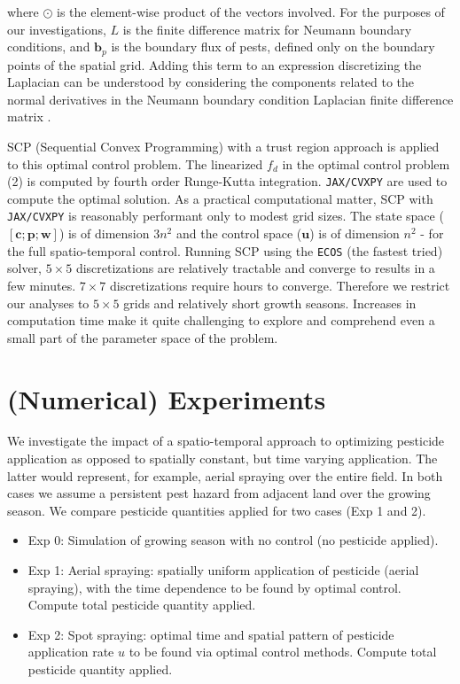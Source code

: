 \documentclass[11pt]{article}
\begin{document}
where $\odot$ is the element-wise product of the vectors involved. For the purposes of our investigations, $L$ is the finite difference matrix for Neumann boundary conditions, and $\bm{b}_p$ is the boundary flux of pests, defined only on the boundary points of the spatial grid. Adding this term to an expression discretizing the Laplacian can be understood by considering the components related to the normal derivatives in the Neumann boundary condition Laplacian finite difference matrix \cite{R5}.

SCP (Sequential Convex Programming) with a trust region approach is applied to this optimal control problem. The linearized $f_d$ in the optimal control problem (2) is computed by fourth order Runge-Kutta integration. \texttt{JAX/CVXPY} are used to compute the optimal solution. As a practical computational matter, SCP with \texttt{JAX/CVXPY} is reasonably performant only to modest grid sizes. The state space ($[\bm{c};\bm{p};\bm{w}]$) is of dimension $3n^2$ and the control space ($\bm{u}$) is of dimension $n^2$ - for the full spatio-temporal control. Running SCP using the \texttt{ECOS} (the fastest tried) solver, $5 \times 5$ discretizations are relatively tractable and converge to results in a few minutes. $7 \times 7$ discretizations require hours to converge. Therefore we restrict our analyses to $5 \times 5$ grids and relatively short growth seasons. Increases in computation time make it quite challenging to explore and comprehend even a small part of the parameter space of the problem.

\section{(Numerical) Experiments}

We investigate the impact of a spatio-temporal approach to optimizing pesticide application as opposed to spatially constant, but time varying application. The latter would represent, for example, aerial spraying over the entire field. In both cases we assume a persistent pest hazard from adjacent land over the growing season. We compare pesticide quantities applied for two cases (Exp 1 and 2).

\begin{itemize}
	\setlength\itemsep{-1pt}
	\item Exp 0: Simulation of growing season with no control (no pesticide applied).
	\item Exp 1: Aerial spraying: spatially uniform application of pesticide (aerial spraying), with the time dependence to be found by optimal control. Compute total pesticide quantity applied.
	\item Exp 2: Spot spraying: optimal time and spatial pattern of pesticide application rate $u$ to be found via optimal control methods. Compute total pesticide quantity applied.
\end{itemize}
\end{document}
